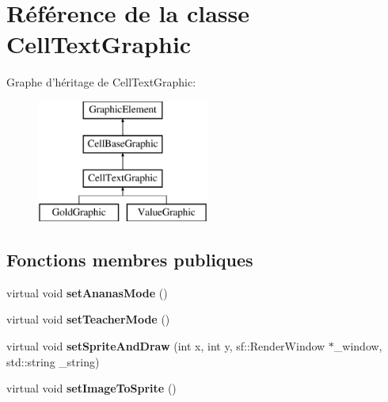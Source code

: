 \hypertarget{class_cell_text_graphic}{\section{Référence de la classe Cell\-Text\-Graphic}
\label{class_cell_text_graphic}
}
Graphe d'héritage de Cell\-Text\-Graphic\-:\begin{figure}[H]
\begin{center}
\leavevmode
\includegraphics[height=4.000000cm]{class_cell_text_graphic}
\end{center}
\end{figure}
\subsection*{Fonctions membres publiques}
\begin{DoxyCompactItemize}
\item 
\hypertarget{class_cell_text_graphic_adc86a0a31ed4d6c4d50f5b0267008d2f}{virtual void {\bfseries set\-Ananas\-Mode} ()}\label{class_cell_text_graphic_adc86a0a31ed4d6c4d50f5b0267008d2f}

\item 
\hypertarget{class_cell_text_graphic_a8cf1549a23ffa44543819ef3b11e3fad}{virtual void {\bfseries set\-Teacher\-Mode} ()}\label{class_cell_text_graphic_a8cf1549a23ffa44543819ef3b11e3fad}

\item 
\hypertarget{class_cell_text_graphic_ad5f099b24da5923dcdf86274466c2630}{virtual void {\bfseries set\-Sprite\-And\-Draw} (int x, int y, sf\-::\-Render\-Window $\ast$\-\_\-window, std\-::string \-\_\-string)}\label{class_cell_text_graphic_ad5f099b24da5923dcdf86274466c2630}

\item 
\hypertarget{class_cell_text_graphic_a7d8d3ec20aa796b6ae882291b043f0f8}{virtual void {\bfseries set\-Image\-To\-Sprite} ()}\label{class_cell_text_graphic_a7d8d3ec20aa796b6ae882291b043f0f8}

\end{DoxyCompactItemize}
